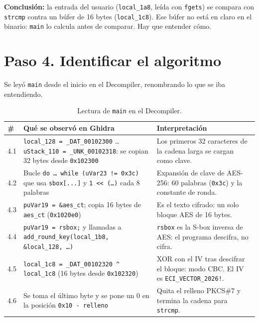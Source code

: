 \documentclass[journal]{IEEEtran}
\begin{document}
\noindent\textbf{Conclusi\'on:} la entrada del usuario (\texttt{local\_\allowbreak{}1a8}, le\'ida
con \texttt{fgets}) se compara con \texttt{strcmp} contra un b\'ufer de 16 bytes
(\texttt{local\_\allowbreak{}1c8}). Ese b\'ufer no est\'a en claro en el binario: \texttt{main}
lo calcula antes de comparar. Hay que entender c\'omo.

\section{Paso 4. Identificar el algoritmo}

Se ley\'o \texttt{main} desde el inicio en el Decompiler, renombrando lo que se
iba entendiendo.

\begin{table}[H]
\centering
\caption{Lectura de \texttt{main} en el Decompiler.}
\footnotesize
\begin{tabular}{@{}l p{1.5in} p{1.3in}@{}}
\hline
\# & Qu\'e se observ\'o en Ghidra & Interpretaci\'on \\ \hline
4.1 & \texttt{local\_\allowbreak{}128 = \_\allowbreak{}DAT\_\allowbreak{}00102300} \ldots{} \texttt{uStack\_\allowbreak{}110 = \_\allowbreak{}UNK\_\allowbreak{}00102318}: se copian 32 bytes desde \texttt{0x102300} & Los primeros 32 caracteres de la cadena larga se cargan como clave. \\
4.2 & Bucle \texttt{do \ldots{} while (uVar23 != 0x3c)} que usa \texttt{sbox[...]} y \texttt{1 \textless{}\textless{} (\ldots)} cada 8 palabras & Expansi\'on de clave de AES-256: 60 palabras (\texttt{0x3c}) y la constante de ronda. \\
4.3 & \texttt{puVar19 = \&aes\_\allowbreak{}ct}; copia 16 bytes de \texttt{aes\_\allowbreak{}ct} (\texttt{0x1020e0}) & Es el texto cifrado: un solo bloque AES de 16 bytes. \\
4.4 & \texttt{puVar19 = rsbox;} y llamadas a \texttt{add\_\allowbreak{}round\_\allowbreak{}key(local\_\allowbreak{}1b8, \&local\_\allowbreak{}128, \ldots)} & \texttt{rsbox} es la S-box inversa de AES: el programa descifra, no cifra. \\
4.5 & \texttt{local\_\allowbreak{}1c8 = \_\allowbreak{}DAT\_\allowbreak{}00102320 \^{} local\_\allowbreak{}1c8} (16 bytes desde \texttt{0x102320}) & XOR con el IV tras descifrar el bloque: modo CBC. El IV es \texttt{ECI\_\allowbreak{}VECTOR\_\allowbreak{}2026!}. \\
4.6 & Se toma el \'ultimo byte y se pone un 0 en la posici\'on \texttt{0x10 - relleno} & Quita el relleno PKCS\#7 y termina la cadena para \texttt{strcmp}. \\ \hline
\end{tabular}
\end{table}
\end{document}
